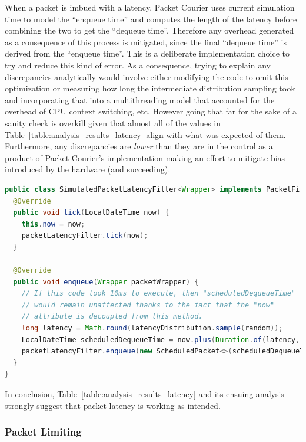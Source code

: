 When a packet is imbued with a latency, Packet Courier uses current simulation time to model the ``enqueue time'' and
computes the length of the latency before combining the two to get the ``dequeue time''. Therefore any overhead
generated as a consequence of this process is mitigated, since the final ``dequeue time'' is derived from the
``enqueue time''. This is a deliberate implementation choice to try and reduce this kind of error. As a consequence,
trying to explain any discrepancies analytically would involve either modifying the code to omit this optimization or
measuring how long the intermediate distribution sampling took and incorporating that into a multithreading model
that accounted for the overhead of CPU context switching, etc. However going that far for the sake of a sanity check
is overkill given that almost all of the values in Table~\ref{table:analysis_results_latency} align with what was
expected of them. Furthermore, any discrepancies are \emph{lower} than they are in the control as a product of Packet
Courier's implementation making an effort to mitigate bias introduced by the hardware (and succeeding).

\begin{lstlisting}[language=Java,caption={A cut-down version of the \texttt{SimulatedPacketLatencyFilter<Wrapper>}
class.},label={code:simulated_latency_enqueue_method},captionpos=b]
public class SimulatedPacketLatencyFilter<Wrapper> implements PacketFilter<Wrapper> {
  @Override
  public void tick(LocalDateTime now) {
    this.now = now;
    packetLatencyFilter.tick(now);
  }

  @Override
  public void enqueue(Wrapper packetWrapper) {
    // If this code took 10ms to execute, then "scheduledDequeueTime"
    // would remain unaffected thanks to the fact that the "now"
    // attribute is decoupled from this method.
    long latency = Math.round(latencyDistribution.sample(random));
    LocalDateTime scheduledDequeueTime = now.plus(Duration.of(latency, timeUnit));
    packetLatencyFilter.enqueue(new ScheduledPacket<>(scheduledDequeueTime, packetWrapper));
  }
}
\end{lstlisting}

In conclusion, Table~\ref{table:analysis_results_latency} and its ensuing analysis strongly suggest that packet
latency is working as intended.

\subsubsection{Packet Limiting}\label{subsubsection:limit_analysis}

